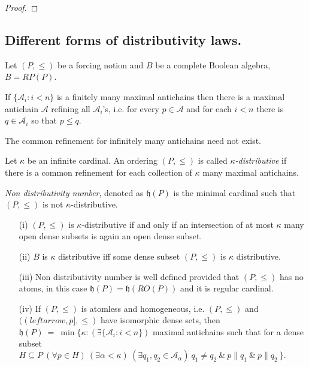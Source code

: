 \begin{proof}

\end{proof}

\subsection{${}$Different forms of distributivity laws.}\label{M-order}

Let $(P,\leq)$ be a forcing notion and $B$ be a complete Boolean algebra, $B = RP(P)$.

If $\{\mathcal A_i : i < n \}$ is a finitely many maximal antichains then there is
a maximal antichain $\mathcal A$ refining all $\mathcal A_i$'s, i.e.
for every $p \in \mathcal A$ and  for each $i < n$ there is $q \in \mathcal A_i$ so that $p \leq q$.

The common refinement for infinitely many antichains need not exist.

\begin{definition}
 Let $\kappa$ be an infinite  cardinal. An ordering $(P,\leq)$ is called
\emph{$\kappa$-distributive} if there is a common refinement for each collection of $\kappa$ many
maximal antichains.

\emph{Non distributivity number}, denoted as $\mathfrak h(P)$ is the minimal cardinal
such that $(P,\leq)$ is not $\kappa$-distributive.
\end{definition}

\begin{fact}
\begin{itemize}
 \item[(i)] $(P,\leq)$ is $\kappa$-distributive if and only if an intersection of at most $\kappa$ many open
 dense subsets is again an open dense subset.
 \item[(ii)] $B$ is $\kappa$ distributive iff some dense subset $(P,\leq)$ is $\kappa$ distributive.
 \item[(iii)] Non distributivity number is well defined provided that $(P,\leq)$ has no atoms, in this
	case $\mathfrak h(P) = \mathfrak h(RO(P))$ and it is regular cardinal.
 \item[(iv)] If $(P,\leq)$ is atomless and homogeneous, i.e. $(P,\leq)$ and $((leftarrow,p],\leq)$
	have isomorphic dense sets, then
	$
	\mathfrak h(P) \ = \ \min \{\kappa : (\exists \{\mathcal A_i : i < n \})$ maximal
	antichains such that for a dense subset $H \subseteq P \ (\forall p \in H) \
	(\exists \alpha < \kappa) \ (\exists q_1,q_2 \in \mathcal A_\alpha) \ q_1 \not = q_2 \ \&
	\ p \parallel q_1 \ \& \ p \parallel q_2 \ \}.
	$
\end{itemize}
\end{fact}

